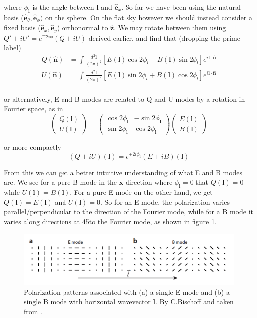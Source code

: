 \documentclass[a4paper,10pt]{article}
\renewcommand{\v}[1]{\mathbf{#1}}
\newcommand{\finttwo}[1]{\int \frac{d^2 \v{#1}}{(2\pi)^2}}
\newcommand{\unit}[1]{\hat{\v{#1}}}
\begin{document}
where $\phi_\v{l}$ is the angle between $\v{l}$ and $\unit{e}_x$. So far we have been using the natural basis ($\unit{e}_\theta, \unit{e}_\phi)$ on the sphere. On the flat sky however we should instead consider a fixed basis ($\unit{e}_x, \unit{e}_y$) orthonormal to $\unit{z}$. We may rotate between them using $Q'\pm iU' = e^{\mp 2i\phi}(Q\pm iU)$ derived earlier, and find that (dropping the prime label)
\begin{equation}\begin{split}
Q(\unit{n}) &= \finttwo{l} [E(\v{l})\cos{2\phi_l}-B(\v{l})\sin{2\phi_l}]  e^{i\v{l}\cdot\unit{n}}\\
U(\unit{n}) &= \finttwo{l} [E(\v{l})\sin{2\phi_l}+B(\v{l})\cos{2\phi_l}]  e^{i\v{l}\cdot\unit{n}}\\
\end{split}\end{equation}

or alternatively, E and B modes are related to Q and U modes by a rotation in Fourier space, as in \cite{baldauf}
\begin{equation}
\begin{pmatrix}
Q(\v{l})\\
U(\v{l}) 
\end{pmatrix}
=
\begin{pmatrix}
\cos{2\phi_\v{l}} & -\sin{2\phi_\v{l}}\\ 
\sin{2\phi_\v{l}} & \cos{2\phi_\v{l}}
\end{pmatrix}
\begin{pmatrix}
E(\v{l})\\
B(\v{l}) 
\end{pmatrix}
\end{equation}

or more compactly
\begin{equation}
(Q\pm iU)(\v{l}) = e^{\pm2i\phi_\v{l}}(E\pm iB)(\v{l})
\label{QUrotateflat}
\end{equation}

From this we can get a better intuitive understanding of what E and B modes are. We see for a pure B mode in the $\unit{x}$ direction where $\phi_\v{l} = 0$ that $Q(\v{l})=0$ while $U(\v{l})=B(\v{l})$. For a pure E mode on the other hand, we get  $Q(\v{l})=E(\v{l})$ and $U(\v{l})=0$. So for an E mode, the polarization varies parallel/perpendicular to the direction of the Fourier mode, while for a B mode it varies along directions at 45\textdegree to the Fourier mode, as shown in figure \ref{EBint}.

\begin{figure}[h]
  \includegraphics[width=0.7\linewidth]{EBintuition.png}
  \centering
  \caption{Polarization patterns associated with (a) a single E mode and (b) a single B mode with horizontal wavevector $\v{l}$. By C.Bischoff and taken from \cite{QBM}.}
  \label{EBint}
\end{figure}
\end{document}
